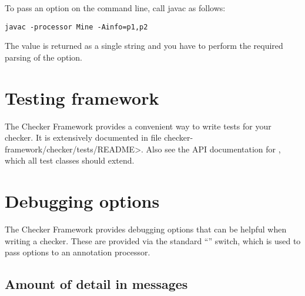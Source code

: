 To pass an option on the command line, call javac as follows:

\begin{Verbatim}
javac -processor Mine -Ainfo=p1,p2
\end{Verbatim}

The value is returned as a single string and you have to perform the
required parsing of the option.





\section{Testing framework\label{testing-framework}}

\begin{sloppypar}
The Checker Framework provides a convenient way to write tests for your
checker.
It is extensively documented in file \<checker-framework/checker/tests/README>.
Also see the API documentation for
,
which all test classes should extend.
\end{sloppypar}


\section{Debugging options\label{debugging-options}}

The Checker Framework provides debugging options that can be helpful when
writing a checker. These are provided via the standard  ``''
switch, which is used to pass options to an annotation processor.


\subsection{Amount of detail in messages\label{debugging-options-detail}}

